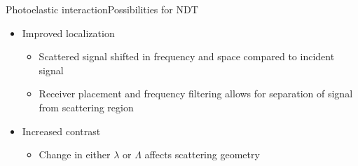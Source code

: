 \documentclass[11pt]{beamer}
\begin{document}
	\begin{frame}{Photoelastic interaction}{Possibilities for NDT}
		\pause
		\begin{itemize}
			\item Improved localization
			\begin{itemize}
				\item Scattered signal shifted in frequency and space compared to incident signal
				\item Receiver placement and frequency filtering allows for separation of signal from scattering region
			\end{itemize} \pause
			\item Increased contrast
			\begin{itemize}
				\item Change in either $\lambda$ or $\Lambda$ affects scattering geometry
			\end{itemize}
		\end{itemize}
	\end{frame}
	
\end{document}
